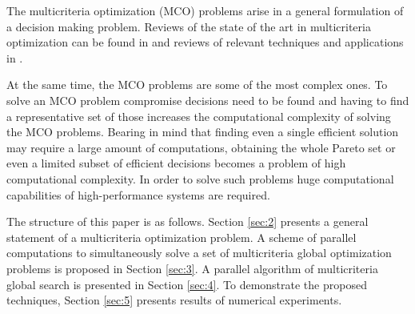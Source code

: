 \documentclass[runningheads]{llncs}
\begin{document}
The multicriteria optimization (MCO) problems arise in a general formulation of a decision making problem. Reviews of the state of the art in multicriteria optimization can be found in \cite{c1,c2,c3,c12} and reviews of relevant techniques and applications in \cite{c4,c5,c6,c7,c13,c50}.

At the same time, the MCO problems are some of the most complex ones. To solve an MCO problem compromise decisions need to be found and having to find a representative set of those increases the computational complexity of solving the MCO problems. Bearing in mind that finding even a single efficient solution may require a large amount of computations, obtaining the whole Pareto set or even a limited subset of efficient decisions becomes a problem of high computational complexity. In order to solve such problems huge computational capabilities of high-performance systems are required. 

The structure of this paper is as follows. Section \ref{sec:2} presents a general statement of a multicriteria optimization problem. A scheme of parallel computations to simultaneously solve a set of multicriteria global optimization problems is proposed in Section \ref{sec:3}. A parallel algorithm of multicriteria global search is presented in Section \ref{sec:4}. To demonstrate the proposed techniques, Section \ref{sec:5} presents results of numerical experiments.
\end{document}
